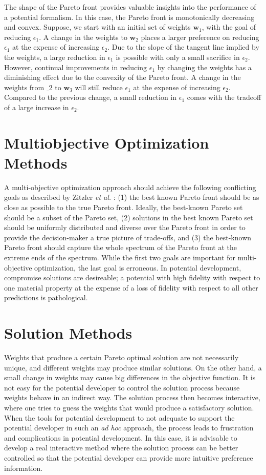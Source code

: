 The shape of the Pareto front provides valuable insights into the performance of a potential formalism.  In this case, the Pareto front is monotonically decreasing and convex.    Suppose, we start with an initial set of weights $\bm{w}_1$, with the goal of reducing $\epsilon_1$.  A change in the weights to $\bm{w}_2$ places a larger preference on reducing $\epsilon_1$ at the expense of increasing $\epsilon_2$.  Due to the slope of the tangent line implied by the weights, a large reduction in $\epsilon_1$ is possible with only a small sacrifice in $\epsilon_2$.  However, continual improvements in reducing $\epsilon_1$ by changing the weights has a diminishing effect due to the convexity of the Pareto front.  A change in the weights from $\bm_{2}$ to $\bm{w}_3$ will still reduce $\epsilon_1$ at the expense of increasing $\epsilon_2$.  Compared to the previous change, a small reduction in $\epsilon_1$ comes with the tradeoff of a large increase in $\epsilon_2$.

\section{Multiobjective Optimization Methods}
A multi-objective optimization approach should achieve the following conflicting goals as described by Zitzler \emph{et al.} \cite{zitzler2000_moo_evolve}: (1) the best known Pareto front should be as close as possible to the true Pareto front.  Ideally, the best-known Pareto set should be a subset of the Pareto set, (2) solutions in the best known Pareto set should be uniformly distributed and diverse over the Pareto front in order to provide the decision-maker a true picture of trade-offs, and (3) the best-known Pareto front should capture the whole spectrum of the Pareto front at the extreme ends of the spectrum.  While the first two goals are important for multi-objective optimization, the last goal is erroneous.  In potential development, compromise solutions are desireable; a potential with high fidelity with respect to one material property at the expense of a loss of fidelity with respect to all other predictions is pathological.

\section{Solution Methods}
Weights that produce a certain Pareto optimal solution are not necessarily unique, and different weights may produce similar solutions.  On the other hand, a small change in weights may cause big differences in the objective function.  It is not easy for the potential developer to control the solution process because weights behave in an indirect way.  The solution process then becomes interactive, where one tries to guess the weights that would produce a satisfactory solution.  When the tools for potential development to not adequate to support the potential developer in such an \emph{ad hoc} approach, the process leads to frustration and complications in potential development.  In this case, it is advisable to develop a real interactive method where the solution process can be better controlled so that the potential developer can provide more intuitive preference information.

